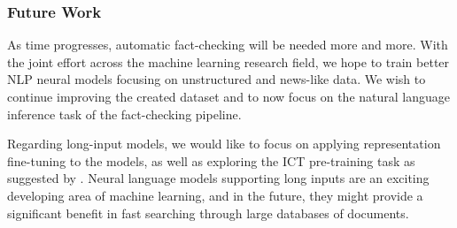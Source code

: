 \subsubsection{Future Work}

As time progresses, automatic fact-checking will be needed more and more.
With the joint effort across the machine learning research field, we hope to train better NLP neural models focusing on unstructured and news-like data.
We wish to continue improving the created \CTK{} dataset and to now focus on the natural language inference task of the fact-checking pipeline. 

Regarding long-input models, we would like to focus on applying representation fine-tuning to the models, as well as exploring the ICT pre-training task as suggested by \citet{two-tower}.
Neural language models supporting long inputs are an exciting developing area of machine learning, and in the future, they might provide a significant benefit in fast searching through large databases of documents.